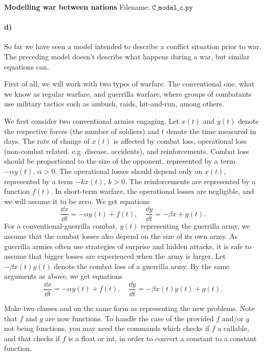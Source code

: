 \begin{Problem}{\textbf{Modelling war between nations}}
Filename: $\texttt{C\_model\_c.py}$

\paragraph{d)}
So far we have seen a model intended to describe a conflict situation prior to war.
The preceding model doesn't describe what happens during a war, but similar equations can.

First of all, we will work with two types of warfare. The conventional one, what we
know as regular warfare, and guerrilla warfare, where groups of combatants use military
tactics such as ambush, raids, hit-and-run, among others.

We first consider two conventional armies engaging. Let $x(t)$ and $y(t)$ denote
the respective forces (the number of soldiers) and $t$ denote the time measured
in days. The rate of change of $x(t)$ is affected by combat loss, operational loss
(non-combat related. e.g. disease, accidents), and reinforcements. Combat loss
should be proportional to the size of the opponent, represented by a term $-\alpha y(t)$, $\alpha > 0$.
The operational losses should depend only on $x(t)$, represented by a term $- k x(t)$, $k> 0$.
The reinforcements are represented by a function $f(t)$. In short-term warfare,
the operational losses are negligible, and we will assume it to be zero. We get
equations
\begin{equation*}
    \frac{\dd x}{\dd t} = -\alpha y(t) + f(t), \quad \frac{\dd y}{\dd t} = -\beta x + g(t).
\end{equation*}
For a conventional-guerrilla combat, $y(t)$ representing the guerrilla army,
we assume that the combat losses also depend on the size of its own army. As
guerrilla armies often use strategies of surprise and hidden attacks, it is safe
to assume that bigger losses are experienced when the army is larger. Let $-\beta x(t)y(t)$
denote the combat loss of a guerrilla army. By the same arguments as above, we get
equations
\begin{equation*}
    \frac{\dd x}{\dd t} = -\alpha y(t) + f(t), \quad \frac{\dd y}{\dd t} = -\beta x(t)y(t) + g(t).
\end{equation*}

Make two classes  and  on the same form as
representing the new problems. Note that $f$ and $g$ are now functions. To handle
the case of the provided $f$ and/or $g$ not being functions, you may need the commands 
which checks if $f$ a callable, and \newline {}
that checks if $f$ is a float or int, in order to convert a constant to a constant function.


\end{Problem}
